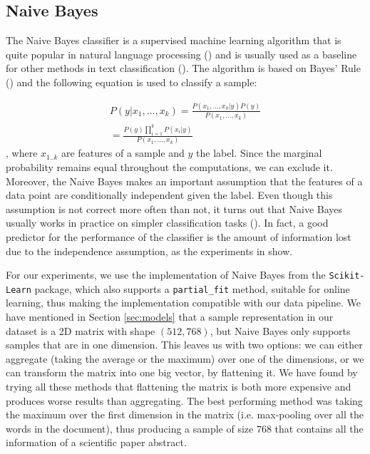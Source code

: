 \documentclass[12pt]{extreport}
\begin{document}
\subsection{Naive Bayes} \label{sec:nb}

The Naive Bayes classifier is a supervised machine learning algorithm that is quite popular in natural language processing (\cite{naivebayes}) and is usually used as a baseline for other methods in text classification (\cite{nb-baseline}). The algorithm is based on Bayes' Rule (\cite{bayesrule}) and the following equation is used to classify a sample:

\begin{align}
    P(y|x_1, ..., x_k) = \frac{P(x_1, ..., x_k|y)P(y)}{P(x_1, ..., x_k)} \\
    = \frac{P(y) \prod_{i = 1}^k P(x_i|y)}{P(x_1, ..., x_k)}
\end{align}
, where $x_{1..k}$ are features of a sample and $y$ the label. Since the marginal probability remains equal throughout the computations, we can exclude it. Moreover, the Naive Bayes makes an important assumption that the features of a data point are conditionally independent given the label. Even though this assumption is not correct more often than not, it turns out that Naive Bayes usually works in practice on simpler classification tasks (\cite{naivebayes}). In fact, a good predictor for the performance of the classifier is the amount of information lost due to the independence assumption, as the experiments in \cite{naivebayes} show.

For our experiments, we use the implementation of Naive Bayes from the \texttt{Scikit-Learn} package, which also supports a \texttt{partial\_fit} method, suitable for online learning, thus making the implementation compatible with our data pipeline. We have mentioned in Section \ref{sec:models} that a sample representation in our dataset is a 2D matrix with shape $(512, 768)$, but Naive Bayes only supports samples that are in one dimension. This leaves us with two options: we can either aggregate (taking the average or the maximum) over one of the dimensions, or we can transform the matrix into one big vector, by flattening it. We have found by trying all these methods that flattening the matrix is both more expensive and produces worse results than aggregating. The best performing method was taking the maximum over the first dimension in the matrix (i.e. max-pooling over all the words in the document), thus producing a sample of size $768$ that contains all the information of a scientific paper abstract.
\end{document}
